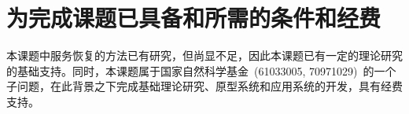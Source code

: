 \section{为完成课题已具备和所需的条件和经费}

本课题中服务恢复的方法已有研究，但尚显不足，因此本课题已有一定的理论研究的基础支持。同时，本课题属于国家自然科学基金~(61033005, 70971029)~的一个子问题，在此背景之下完成基础理论研究、原型系统和应用系统的开发，具有经费支持。